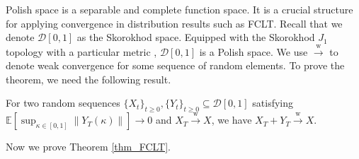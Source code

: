 \documentclass{opt2025} %
\begin{document}
Polish space is a separable and complete function space. It is a crucial structure for applying convergence in distribution results such as FCLT. Recall that we denote $\mathcal{D}[0,1]$ as the Skorokhod space. Equipped with the Skorokhod $J_1$ topology with a particular metric \citep{prokhorov1956convergence}, $\mathcal{D}[0,1]$ is a Polish space. We use $\overset{\mathrm{w}}{\rightarrow}$ to denote weak convergence for some sequence of random elements. To prove the theorem, we need the following result.


\begin{proposition}
\label{prop_conv}
For two random sequences $\{X_t\}_{t \geq 0}, \{Y_t\}_{t \geq 0} \subseteq \mathcal{D}[0,1]$ satisfying $\mathbb{E}[ {\sup}_{\kappa\in [0,1]}\|Y_T(\kappa)\| ]\to 0$ and $X_T \xrightarrow{\mathrm{w}} X$, we have $X_T + Y_T \xrightarrow{\mathrm{w}} X$.
\end{proposition}
Now we prove Theorem \ref{thm_FCLT}.
\end{document}
